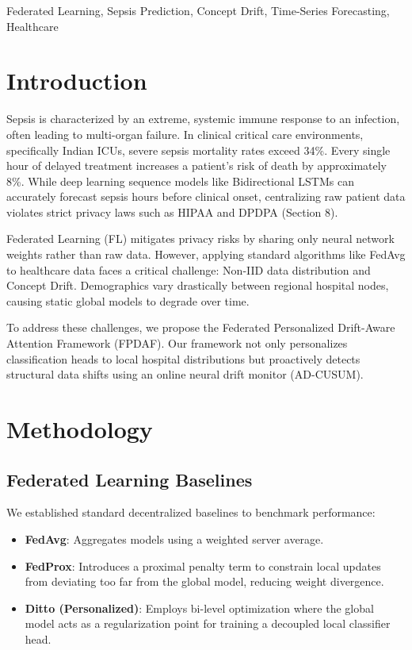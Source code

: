 \documentclass[conference]{IEEEtran}
\begin{document}
\begin{IEEEkeywords}
Federated Learning, Sepsis Prediction, Concept Drift, Time-Series Forecasting, Healthcare
\end{IEEEkeywords}

\section{Introduction}
Sepsis is characterized by an extreme, systemic immune response to an infection, often leading to multi-organ failure. In clinical critical care environments, specifically Indian ICUs, severe sepsis mortality rates exceed 34\%. Every single hour of delayed treatment increases a patient's risk of death by approximately 8\%. While deep learning sequence models like Bidirectional LSTMs can accurately forecast sepsis hours before clinical onset, centralizing raw patient data violates strict privacy laws such as HIPAA and DPDPA (Section 8). 

Federated Learning (FL) mitigates privacy risks by sharing only neural network weights rather than raw data. However, applying standard algorithms like FedAvg to healthcare data faces a critical challenge: Non-IID data distribution and Concept Drift. Demographics vary drastically between regional hospital nodes, causing static global models to degrade over time.

To address these challenges, we propose the Federated Personalized Drift-Aware Attention Framework (FPDAF). Our framework not only personalizes classification heads to local hospital distributions but proactively detects structural data shifts using an online neural drift monitor (AD-CUSUM). 

\section{Methodology}

\subsection{Federated Learning Baselines}
We established standard decentralized baselines to benchmark performance:
\begin{itemize}
    \item \textbf{FedAvg}: Aggregates models using a weighted server average. 
    \item \textbf{FedProx}: Introduces a proximal penalty term to constrain local updates from deviating too far from the global model, reducing weight divergence.
    \item \textbf{Ditto (Personalized)}: Employs bi-level optimization where the global model acts as a regularization point for training a decoupled local classifier head.
\end{itemize}
\end{document}
